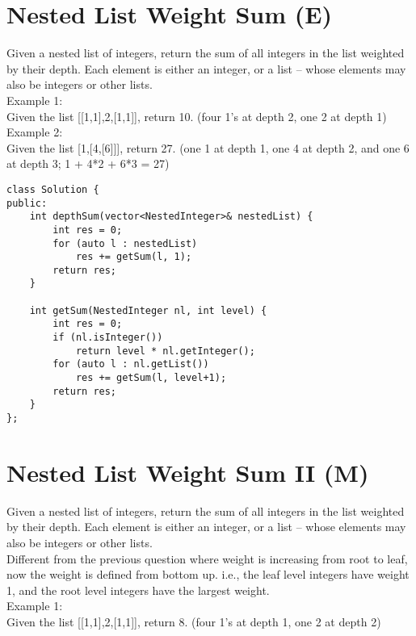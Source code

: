 \section{Nested List Weight Sum (E)}
Given a nested list of integers, return the sum of all integers in the list weighted by their depth. Each element is either an integer, or a list -- whose elements may also be integers or other lists. \\

Example 1:\\
Given the list [[1,1],2,[1,1]], return 10. (four 1's at depth 2, one 2 at depth 1)\\

Example 2:\\
Given the list [1,[4,[6]]], return 27. (one 1 at depth 1, one 4 at depth 2, and one 6 at depth 3; 1 + 4*2 + 6*3 = 27) \\
 
\begin{lstlisting}
class Solution {
public:
    int depthSum(vector<NestedInteger>& nestedList) {
        int res = 0;
        for (auto l : nestedList)
            res += getSum(l, 1);
        return res;
    }
        
    int getSum(NestedInteger nl, int level) {
        int res = 0;
        if (nl.isInteger())
            return level * nl.getInteger();
        for (auto l : nl.getList())
            res += getSum(l, level+1);
        return res;
    }
};
\end{lstlisting}


\section{Nested List Weight Sum II (M)}
Given a nested list of integers, return the sum of all integers in the list weighted by their depth. Each element is either an integer, or a list -- whose elements may also be integers or other lists.\\

Different from the previous question where weight is increasing from root to leaf, now the weight is defined from bottom up. i.e., the leaf level integers have weight 1, and the root level integers have the largest weight. \\

Example 1:\\
Given the list [[1,1],2,[1,1]], return 8. (four 1's at depth 1, one 2 at depth 2)\\

